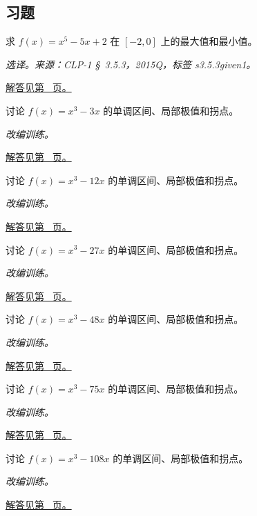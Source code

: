 \documentclass[12pt,fontset=fandol]{ctexart}
\begin{document}
\subsection{习题}
\begin{example}[闭区间最值的候选点]\label{ex:c11q1}
求 $f(x)=x^5-5x+2$ 在 $[-2,0]$ 上的最大值和最小值。
\par\textit{选译。来源：CLP-1 \S~3.5.3，2015Q，标签 s3.5.3given1。}\par\hyperref[ans:c11q1]{解答见第~\pageref{ans:c11q1} 页。}
\end{example}
\begin{example}[三次函数的极值与凹凸]\label{ex:c11q2}
讨论 $f(x)=x^3-3x$ 的单调区间、局部极值和拐点。
\par\textit{改编训练。}\par\hyperref[ans:c11q2]{解答见第~\pageref{ans:c11q2} 页。}
\end{example}
\begin{example}[三次函数的极值与凹凸]\label{ex:c11q3}
讨论 $f(x)=x^3-12x$ 的单调区间、局部极值和拐点。
\par\textit{改编训练。}\par\hyperref[ans:c11q3]{解答见第~\pageref{ans:c11q3} 页。}
\end{example}
\begin{example}[三次函数的极值与凹凸]\label{ex:c11q4}
讨论 $f(x)=x^3-27x$ 的单调区间、局部极值和拐点。
\par\textit{改编训练。}\par\hyperref[ans:c11q4]{解答见第~\pageref{ans:c11q4} 页。}
\end{example}
\begin{example}[三次函数的极值与凹凸]\label{ex:c11q5}
讨论 $f(x)=x^3-48x$ 的单调区间、局部极值和拐点。
\par\textit{改编训练。}\par\hyperref[ans:c11q5]{解答见第~\pageref{ans:c11q5} 页。}
\end{example}
\begin{example}[三次函数的极值与凹凸]\label{ex:c11q6}
讨论 $f(x)=x^3-75x$ 的单调区间、局部极值和拐点。
\par\textit{改编训练。}\par\hyperref[ans:c11q6]{解答见第~\pageref{ans:c11q6} 页。}
\end{example}
\begin{example}[三次函数的极值与凹凸]\label{ex:c11q7}
讨论 $f(x)=x^3-108x$ 的单调区间、局部极值和拐点。
\par\textit{改编训练。}\par\hyperref[ans:c11q7]{解答见第~\pageref{ans:c11q7} 页。}
\end{example}
\end{document}
